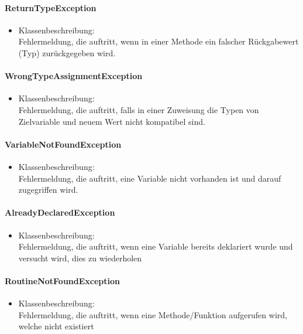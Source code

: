 \documentclass[parskip=full]{scrartcl}
\begin{document}
\paragraph{ReturnTypeException}
\begin{itemize}
\item Klassenbeschreibung: \\
Fehlermeldung, die auftritt, wenn in einer Methode ein falscher Rückgabewert (Typ) zurückgegeben wird.
\end{itemize}

\paragraph{WrongTypeAssignmentException}
\begin{itemize}
\item Klassenbeschreibung: \\
Fehlermeldung, die auftritt, falls in einer Zuweisung die Typen von Zielvariable und neuem Wert nicht kompatibel sind.
\end{itemize}
\paragraph{VariableNotFoundException}
\begin{itemize}
\item Klassenbeschreibung: \\
Fehlermeldung, die auftritt, eine Variable nicht vorhanden ist und darauf zugegriffen wird.
\end{itemize}

\paragraph{AlreadyDeclaredException}
\begin{itemize}
\item Klassenbeschreibung: \\
Fehlermeldung, die auftritt, wenn eine Variable bereits deklariert wurde und versucht wird, dies zu wiederholen
\end{itemize}

\paragraph{RoutineNotFoundException}
\begin{itemize}
\item Klassenbeschreibung: \\
Fehlermeldung, die auftritt, wenn eine Methode/Funktion aufgerufen wird, welche nicht existiert
\end{itemize}
\end{document}
